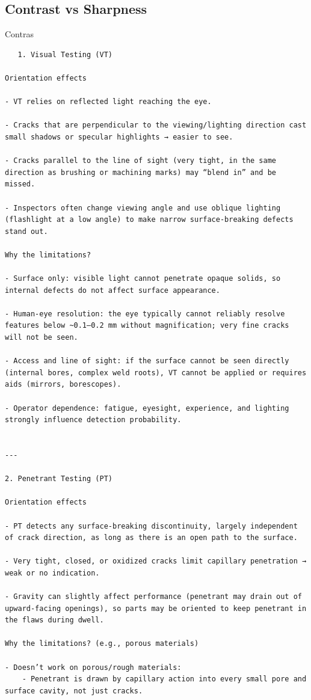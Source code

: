 \documentclass[11pt]{article}
\begin{document}
\subsection{Contrast vs Sharpness}
Contras
\begin{verbatim}
   1. Visual Testing (VT)

Orientation effects

- VT relies on reflected light reaching the eye.

- Cracks that are perpendicular to the viewing/lighting direction cast small shadows or specular highlights → easier to see.

- Cracks parallel to the line of sight (very tight, in the same direction as brushing or machining marks) may “blend in” and be missed.

- Inspectors often change viewing angle and use oblique lighting (flashlight at a low angle) to make narrow surface-breaking defects stand out.

Why the limitations?

- Surface only: visible light cannot penetrate opaque solids, so internal defects do not affect surface appearance.

- Human-eye resolution: the eye typically cannot reliably resolve features below ~0.1–0.2 mm without magnification; very fine cracks will not be seen.

- Access and line of sight: if the surface cannot be seen directly (internal bores, complex weld roots), VT cannot be applied or requires aids (mirrors, borescopes).

- Operator dependence: fatigue, eyesight, experience, and lighting strongly influence detection probability.


---

2. Penetrant Testing (PT)

Orientation effects

- PT detects any surface-breaking discontinuity, largely independent of crack direction, as long as there is an open path to the surface.

- Very tight, closed, or oxidized cracks limit capillary penetration → weak or no indication.

- Gravity can slightly affect performance (penetrant may drain out of upward-facing openings), so parts may be oriented to keep penetrant in the flaws during dwell.

Why the limitations? (e.g., porous materials)

- Doesn’t work on porous/rough materials:
	- Penetrant is drawn by capillary action into every small pore and surface cavity, not just cracks.


\end{verbatim}
\end{document}
